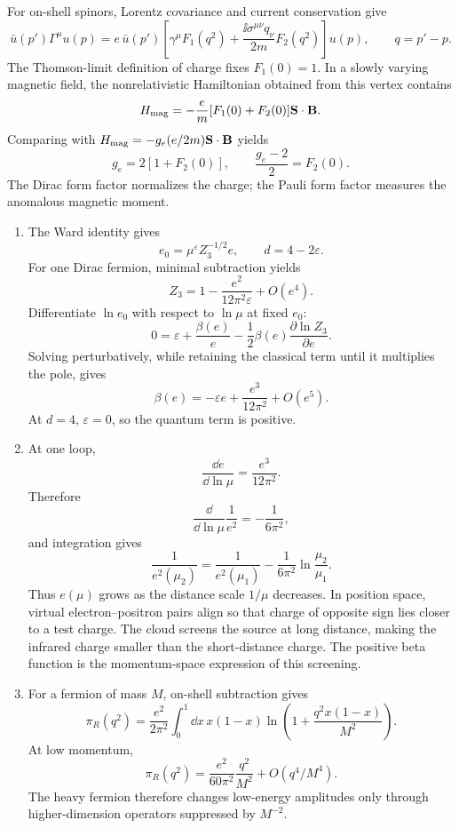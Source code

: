 \begin{enumerate}
For on-shell spinors, Lorentz covariance and current conservation give
\[
 \bar u(p')\Gamma^\mu u(p)
 =e\,\bar u(p')\left[
 \gamma^\mu F_1(q^2)
 +\frac{\ii\sigma^{\mu\nu}q_\nu}{2m}F_2(q^2)
 \right]u(p),
 \qquad q=p'-p.
\]
The Thomson-limit definition of charge fixes \(F_1(0)=1\).  In a slowly
varying magnetic field, the nonrelativistic Hamiltonian obtained from this
vertex contains
\[
 H_{\rm mag}=-\frac{e}{m}[F_1(0)+F_2(0)]
 \mathbf S\cdot\mathbf B.
\]
Comparing with
\(H_{\rm mag}=-g_e(e/2m)\mathbf S\cdot\mathbf B\) yields
\[
 g_e=2[1+F_2(0)],\qquad
 \boxed{\frac{g_e-2}{2}=F_2(0).}
\]
The Dirac form factor normalizes the charge; the Pauli form factor measures
the anomalous magnetic moment.

\begin{enumerate}
\item
The Ward identity gives
\[
 e_0=\mu^\varepsilon Z_3^{-1/2}e,\qquad d=4-2\varepsilon.
\]
For one Dirac fermion, minimal subtraction yields
\[
 Z_3=1-\frac{e^2}{12\pi^2\varepsilon}+O(e^4).
\]
Differentiate \(\ln e_0\) with respect to \(\ln\mu\) at fixed \(e_0\):
\[
 0=\varepsilon+\frac{\beta(e)}e
 -\frac12\beta(e)\frac{\partial\ln Z_3}{\partial e}.
\]
Solving perturbatively, while retaining the classical term until it
multiplies the pole, gives
\[
 \boxed{\beta(e)=-\varepsilon e+\frac{e^3}{12\pi^2}+O(e^5).}
\]
At \(d=4\), \(\varepsilon=0\), so the quantum term is positive.
\item
At one loop,
\[
 \frac{\dd e}{\dd\ln\mu}=\frac{e^3}{12\pi^2}.
\]
Therefore
\[
 \frac{\dd}{\dd\ln\mu}\frac1{e^2}=-\frac1{6\pi^2},
\]
and integration gives
\[
 \boxed{\;
 \frac1{e^2(\mu_2)}
 =\frac1{e^2(\mu_1)}
 -\frac1{6\pi^2}\ln\frac{\mu_2}{\mu_1}.
 \;}
\]
Thus \(e(\mu)\) grows as the distance scale \(1/\mu\) decreases.  In
position space, virtual electron--positron pairs align so that charge of
opposite sign lies closer to a test charge.  The cloud screens the source at
long distance, making the infrared charge smaller than the short-distance
charge.  The positive beta function is the momentum-space expression of
this screening.
\item
For a fermion of mass \(M\), on-shell subtraction gives
\[
 \pi_R(q^2)=\frac{e^2}{2\pi^2}\int_0^1\dd x\,x(1-x)
 \ln\left(1+\frac{q^2x(1-x)}{M^2}\right).
\]
At low momentum,
\[
 \boxed{\;
 \pi_R(q^2)=\frac{e^2}{60\pi^2}\frac{q^2}{M^2}
 +O(q^4/M^4).
 \;}
\]
The heavy fermion therefore changes low-energy amplitudes only through
higher-dimension operators suppressed by \(M^{-2}\).


\end{enumerate}
\end{enumerate}
